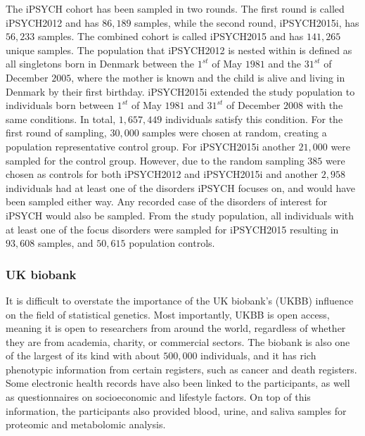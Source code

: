 The iPSYCH cohort has been sampled in two rounds. The first round is called iPSYCH2012 and has $ 86,189 $ samples, while the second round, iPSYCH2015i, has $ 56,233 $ samples. The combined cohort is called iPSYCH2015 and has $ 141,265 $ unique samples. The population that iPSYCH2012 is nested within is defined as all singletons born in Denmark between the $ 1^{st} $ of May $ 1981 $ and the $ 31^{st} $ of December $ 2005 $, where the mother is known and the child is alive and living in Denmark by their first birthday. iPSYCH2015i extended the study population to individuals born between $ 1^{st} $ of May $ 1981 $ and $ 31^{st} $ of December $ 2008 $ with the same conditions. In total, $ 1,657,449 $ individuals satisfy this condition. For the first round of sampling, $ 30,000 $ samples were chosen at random, creating a population representative control group. For iPSYCH2015i another $ 21,000 $ were sampled for the control group. However, due to the random sampling $ 385 $ were chosen as controls for both iPSYCH2012 and iPSYCH2015i and another $ 2,958 $ individuals had at least one of the disorders iPSYCH focuses on, and would have been sampled either way. Any recorded case of the disorders of interest for iPSYCH would also be sampled. From the study population, all individuals with at least one of the focus disorders were sampled for iPSYCH2015 resulting in $ 93,608 $ samples, and $ 50,615 $ population controls\cite{pedersen2018ipsych2012,bybjerg2020ipsych2015}.

\subsubsection{UK biobank}

It is difficult to overstate the importance of the UK biobank's (UKBB) influence on the field of statistical genetics. Most 
importantly, UKBB is open access, meaning it is open to researchers from around the world, regardless of whether they are from 
academia, charity, or commercial sectors\cite{bycroft2018uk,biobank2015genotyping}. The biobank is also one of the largest of its kind 
with about $ 500,000 $ individuals, and it has rich phenotypic information from certain registers, such as cancer and death registers. 
Some electronic health records have also been linked to the participants, as well as questionnaires on socioeconomic and lifestyle  
factors. On top of this information, the participants also provided blood, urine, and saliva samples for proteomic and metabolomic 
analysis.

